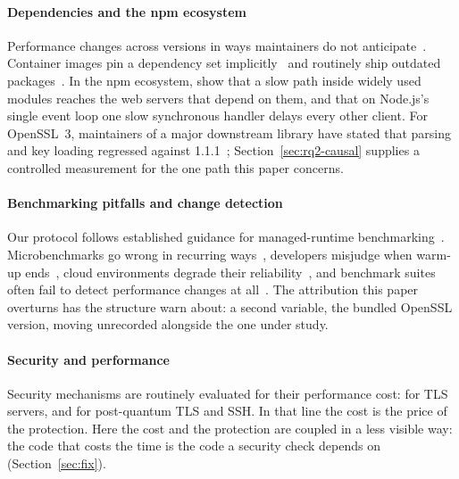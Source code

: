 \documentclass[preprint,12pt,authoryear]{elsarticle}
\begin{document}
\paragraph{Dependencies and the npm ecosystem} Performance changes across
versions in ways maintainers do not
anticipate~\citep{kaltenecker2023performance,chen2017exploratory}. Container
images pin a dependency set implicitly~\citep{cito2017empirical} and routinely
ship outdated packages~\citep{zerouali2019outdated}. In the npm ecosystem,
\citet{staicu2018freezing} show that a slow path inside widely used modules
reaches the web servers that depend on them, and \citet{davis2018sense} that on
Node.js's single event loop one slow synchronous handler delays every other
client. For OpenSSL~3, maintainers of a
major downstream library have stated that parsing and key loading regressed
against 1.1.1~\citep{pyca2026stateofopenssl}; Section~\ref{sec:rq2-causal}
supplies a controlled measurement for the one path this paper concerns.

\paragraph{Benchmarking pitfalls and change detection} Our protocol follows
established guidance for managed-runtime
benchmarking~\citep{georges2007statistically,kalibera2013rigorous,barrett2017warmup}.
Microbenchmarks go wrong in recurring ways~\citep{costa2021wrong}, developers
misjudge when warm-up ends~\citep{traini2023steady}, cloud environments degrade
their reliability~\citep{laaber2019cloud}, and benchmark suites often fail to
detect performance changes at all~\citep{laaber2018evaluation}. The attribution
this paper overturns has the structure \citet{mytkowicz2009wrong} warn about: a
second variable, the bundled OpenSSL version, moving unrecorded alongside the
one under study.

\paragraph{Security and performance} Security mechanisms are routinely
evaluated for their performance cost: \citet{coarfa2006performance} for TLS
servers, and \citet{sikeridis2020assessing} for post-quantum TLS and SSH. In
that line the cost is the price of the protection. Here the cost and the
protection are coupled in a less visible way: the code that costs the time is
the code a security check depends on (Section~\ref{sec:fix}).
\end{document}
